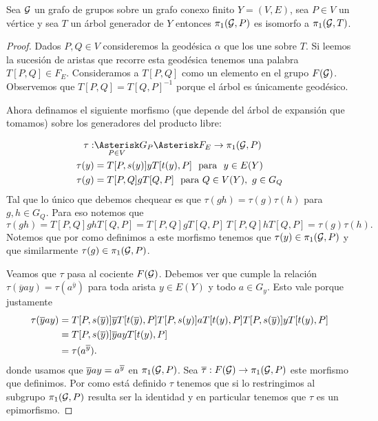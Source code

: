 \documentclass[tesis.tex]{subfiles}
\begin{document}
\begin{teo}\label{teo_grp_fund_iso}
	Sea ${\cal G}$ un grafo de grupos sobre un grafo conexo finito $Y = (V,E)$, sea $P \in V$ un vértice y sea $T$ un árbol generador de $Y$ entonces $\pi_1({\cal G}, P)$ es isomorfo a $\pi_1({\cal G}, T)$.
\end{teo}
\begin{proof}
	Dados $P,Q \in V$ consideremos la geodésica $\alpha$ que los une sobre $T$.
	Si leemos la sucesión de aristas que recorre esta geodésica tenemos una palabra $T[P,Q] \in F_{E}$. 
	Consideramos a $T[P,Q]$ como un elemento en el grupo $F({\cal G})$.
	Observemos que $T[P,Q] = T[Q,P]^{-1}$ porque el árbol es únicamente geodésico.
	
	Ahora definamos el siguiente morfismo (que depende del árbol de expansión que tomamos) sobre los generadores del producto libre:
	
	\begin{align*}
		\tau: & \underset{P \in V}{\Asterisk} G_P \Asterisk F_{E} \to \pi_1(\cG,P)  \\
		 \tau(y) &= T[P,s(y)]yT[t(y),P] \ \ \text{para } \ y\in E(Y) \\
		\tau(g) &= T[P,Q] g T[Q,P] \ \  \text{para} \ Q \in V(Y), \ g \in G_Q
	\end{align*}
	Tal que lo único que debemos chequear es que $\tau(gh) = \tau(g) \tau (h)$ para $g,h \in G_{Q}$.
	Para eso notemos que 
	\[
		\tau(gh) = T[P,Q] gh T[Q,P] = T[P,Q] g T[Q,P] \  T[P,Q] h T[Q,P] = \tau(g)\tau(h).
	\]
	Notemos que por como definimos a este morfismo tenemos que $\tau(y) \in \pi_1({\cal G},P)$ y que similarmente $\tau(g) \in \pi_1({\cal G},P)$.
	

	Veamos que $\tau$ pasa al cociente $F({\cal G})$.
	Debemos ver que cumple la relación $\tau(\overline y a y) = \tau (a^{\overline y})$ para toda arista $y \in E(Y)$ y todo $a \in G_y$.
	Esto vale porque justamente 
	\begin{align*}
		\tau(\overline y a y) & = T[P,s(\overline y)]\overline yT[t(\overline y),P] T[P,s(y)] a T[t(y),P] T[P,s(\overline y)]yT[t( y),P] \\
		& = T[P,s(\overline y)]  \overline y a y T[t( y),P] \\
		& = \tau (a^{\overline y}).
	\end{align*}
	donde usamos que $\overline y a y = a^{\overline y}$ en $\pi_1({\cal G},P)$.
	Sea $\overline{\tau}: F({\cal G}) \to \pi_1({\cal G}, P)$ este morfismo que definimos.
	Por como está definido $\tau$ tenemos que si lo restringimos al subgrupo  $\pi_1({\cal G},P)$ resulta ser la identidad y en particular tenemos que $\tau$ es un epimorfismo.
	

\end{proof}
\end{document}
